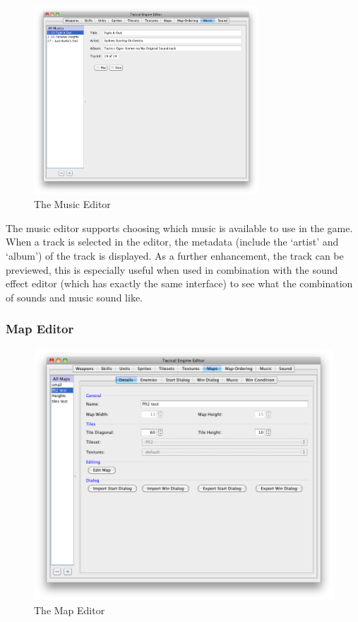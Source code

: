 \begin{figure}[htb]
	\centering
		\includegraphics[width=0.75\textwidth]{figures/editor/Music.png}
	\caption{The Music Editor}
	\label{fig:figures_editor_Music}
\end{figure}
The music editor supports choosing which music is available to use in the game.  When a track is selected in the editor, the metadata (include the `artist' and `album') of the track is displayed.  As a further enhancement, the track can be previewed, this is especially useful when used in combination with the sound effect editor (which has exactly the same interface) to see what the combination of sounds and music sound like. 

\subsubsection{Map Editor}

\begin{figure}[htbp]
	\centering
		\includegraphics[width=.9\textwidth]{figures/editor/maps.png}
	\caption{The Map Editor}
	\label{fig:figures_editor_maps}
\end{figure}

